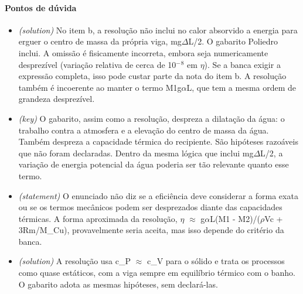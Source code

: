 \documentclass{article}%
\begin{document}
\paragraph{Pontos de dúvida}%
\begin{itemize}%
\item%
\textit{(solution)} No item b, a resolução não inclui no calor absorvido a energia para erguer o centro de massa da própria viga, mg$\Delta$L/2. O gabarito Poliedro inclui. A omissão é fisicamente incorreta, embora seja numericamente desprezível (variação relativa de cerca de 10$^{-}$$^{8}$ em $\eta$). Se a banca exigir a expressão completa, isso pode custar parte da nota do item b. A resolução também é incoerente ao manter o termo M1g$\alpha$L, que tem a mesma ordem de grandeza desprezível.%
\item%
\textit{(key)} O gabarito, assim como a resolução, despreza a dilatação da água: o trabalho contra a atmosfera e a elevação do centro de massa da água. Também despreza a capacidade térmica do recipiente. São hipóteses razoáveis que não foram declaradas. Dentro da mesma lógica que inclui mg$\Delta$L/2, a variação de energia potencial da água poderia ser tão relevante quanto esse termo.%
\item%
\textit{(statement)} O enunciado não diz se a eficiência deve considerar a forma exata ou se os termos mecânicos podem ser desprezados diante das capacidades térmicas. A forma aproximada da resolução, $\eta$ $\approx$ g$\alpha$L(M1 - M2)/($\rho$Vc + 3Rm/M\_Cu), provavelmente seria aceita, mas isso depende do critério da banca.%
\item%
\textit{(solution)} A resolução usa c\_P $\approx$ c\_V para o sólido e trata os processos como quase estáticos, com a viga sempre em equilíbrio térmico com o banho. O gabarito adota as mesmas hipóteses, sem declará{-}las.%
\end{itemize}%
\end{document}
